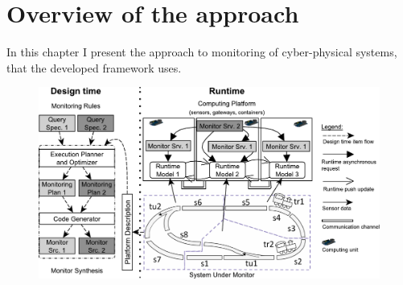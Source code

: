 
\chapter{Overview of the approach}


In this chapter I present the approach to monitoring of cyber-physical systems, that the developed framework uses. 


\begin{figure}[h]
	\begin{center}
		\includegraphics[width=\textwidth]{figures/fase-overview-crop.pdf}
	\end{center}
\end{figure}



